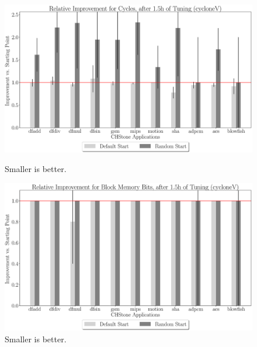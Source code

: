 \documentclass[12pt, a4paper]{article}
\begin{document}
\begin{figure}[htpb]
    \begin{minipage}{.48\textwidth}
        \centering
        \includegraphics[width=.8\textwidth]{rel_comp_cycles_5400_chstone_cycloneV}
        \caption{Smaller is better.}
    \end{minipage}%
    \begin{minipage}{.48\textwidth}
        \centering
        \includegraphics[width=.8\textwidth]{rel_comp_block_5400_chstone_cycloneV}
        \caption{Smaller is better.}
    \end{minipage}%
\end{figure}
\end{document}
